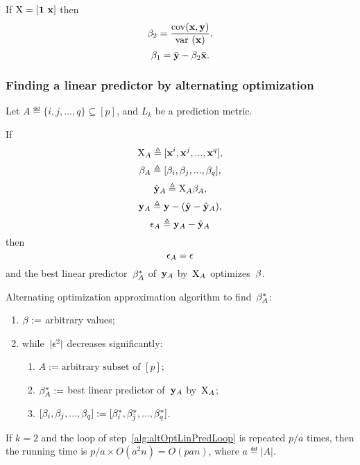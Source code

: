 \documentclass[10pt,a4paper]{article}
\theoremstyle{plain} \newtheorem{Lem}{Lemma}
\begin{document}
If $\mathrm X = [\mathbf 1 \ \mathbf x]$ then
$$ \beta_2 = \frac {\mathrm {cov} (\mathbf x, \mathbf y)} {\mathrm {var} \  (\mathbf x)}, $$
$$ \beta_1 = \bar {\mathbf y} - \beta_2 \bar {\mathbf x}. $$


\subsubsection {Finding a linear predictor by alternating optimization}

Let $A \eqdef \{i,j,\dots,q\} \subseteq [p]$,
and $L_k$ be a prediction metric.

If
$$ \mathrm X_A \triangleq [\mathbf x^i, \mathbf x^j, ..., \mathbf x^q], $$
$$ \mathbf \beta_A \triangleq [\mathbf \beta_i, \mathbf \beta_j, ..., \mathbf \beta_q], $$
$$ \hat {\mathbf y}_A \triangleq \mathrm X_A \mathbf \beta_A, $$
$$ \mathbf y_A \triangleq \mathbf y - (\hat {\mathbf y} - \hat {\mathbf y}_A), $$
$$ \mathbf \epsilon_A \triangleq \mathbf y_A - \hat {\mathbf y}_A $$
then
$$ \mathbf \epsilon_A = \mathbf \epsilon $$
and the best linear predictor~$\mathbf \beta^*_A$ of~$\mathbf y_A$ by~$\mathrm X_A$ optimizes~$\mathbf \beta$.

Alternating optimization approximation algorithm to find~$\mathbf \beta^*_A$:
\begin{enumerate}
  \item $\mathbf \beta := $ arbitrary values;
  \item while~$|\mathbf \epsilon^2|$ decreases significantly:
    \label{alg:altOptLinPredLoop}
    \begin{enumerate}
        \item $A := \textrm {arbitrary subset of } [p]$;
        \item $\mathbf \beta^*_A :=$ best linear predictor of~$\mathbf y_A$ by~$\mathrm X_A$;
        \item $[\mathbf \beta_i, \mathbf \beta_j, ..., \mathbf \beta_q] := [\mathbf \beta^*_i, \mathbf \beta^*_j, ..., \mathbf \beta^*_q]$.
    \end{enumerate}
\end{enumerate}

If $k = 2$ and the loop of step~\ref{alg:altOptLinPredLoop} is repeated $p/a$ times, then the running time is $p/a \times O(a^2 n) = O(pan)$,
where $a \eqdef |A|$.


\vspace {5mm}


\end{document}

